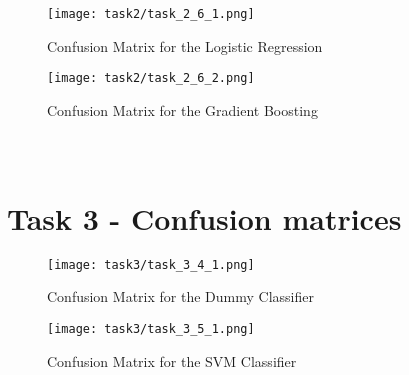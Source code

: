 \documentclass{article}
\begin{document}
    \begin{figure}[H]
    \centering
    \texttt{[image: task2/task\_2\_6\_1.png]}
    \caption{Confusion Matrix for the Logistic Regression}
    \label{fig:svm_confusion_matrix}
    \end{figure}

    \begin{figure}[H]
    \centering
    \texttt{[image: task2/task\_2\_6\_2.png]}
    \caption{Confusion Matrix for the Gradient Boosting}
    \label{fig:svm_confusion_matrix}
    \end{figure}

\section{\\Task 3 - Confusion matrices}
\label{appendix:task3-confusion-matrices}
    \begin{figure}[H]
    \centering
    \texttt{[image: task3/task\_3\_4\_1.png]}
    \caption{Confusion Matrix for the Dummy Classifier}
    \label{fig:dummy_confusion_matrix}
    \end{figure}

    \begin{figure}[H]
    \centering
    \texttt{[image: task3/task\_3\_5\_1.png]}
    \caption{Confusion Matrix for the SVM Classifier}
    \label{fig:svm_confusion_matrix}
    \end{figure}
\end{document}
